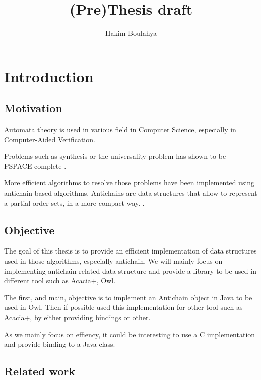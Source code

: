 \documentclass[letterpaper]{memoir}
\title{(Pre)Thesis draft}
\author{Hakim Boulahya}
\begin{document}
\maketitle

\tableofcontents

\listoftodos

\chapter{Introduction}


\section{Motivation}

Automata theory is used in various field in Computer Science, especially
in Computer-Aided Verification.

Problems such as synthesis \cite{ltl_rea}
or the universality problem \cite{ant_univers}
has shown to be PSPACE-complete \cite{bsp, ant_univers}.

More efficient algorithms to resolve those problems have been implemented
using antichain based-algorithms. Antichains are data structures that allow
to represent a partial order sets, in a more compact way.
.


\section{Objective}

The goal of this thesis is to provide an efficient implementation of
data structures used in those algorithms, especially antichain. We will
mainly focus on implementing antichain-related data structure and provide
a library to be used in different tool such as Acacia+, Owl.

The first, and main, objective is to implement an Antichain object
in Java to be used in Owl. Then if possible used this implementation
for other tool such as Acacia+, by either providing bindings or other.

As we mainly focus on effiency, it could be interesting to use a C
implementation and provide binding to a Java class.

\section{Related work}
\end{document}
